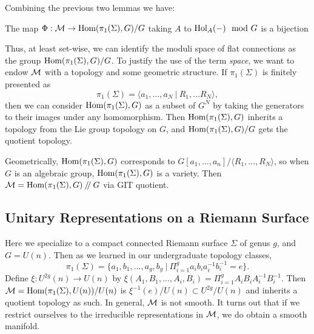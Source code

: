 	Combining the previous two lemmas we have:
	\begin{theorem}
		The map $\Phi:\mathcal{M} \to \text{Hom}(\pi_1(\Sigma), G)/G$ taking $A$ to $\text{Hol}_A(-) \mod G$ is a bijection
	\end{theorem}
	Thus, at least set-wise, we can identify the moduli space of flat connections as the group $\text{Hom}(\pi_1(\Sigma),G)/G$. To justify the use of the term \emph{space}, we want to endow $\mathcal{M}$ with a topology and some geometric structure. If $\pi_1(\Sigma)$ is finitely presented as
	\begin{equation}
		\pi_1(\Sigma) = \langle a_1,...,a_N ~|~ R_1,...R_N \rangle,
	\end{equation}
	then we can consider $\text{Hom}(\pi_1(\Sigma),G)$ as a subset of $G^N$ by taking the generators to their images under any homomorphism. Then $\text{Hom}(\pi_1(\Sigma),G)$ inherits a topology from the Lie group topology on $G$, and $\text{Hom}(\pi_1(\Sigma),G)/G$ gets the quotient topology. 
	
	Geometrically, $\text{Hom}(\pi_1(\Sigma),G)$ corresponds to $G[a_1,...,a_n]/\langle R_1,...,R_N\rangle$, so when $G$ is an algebraic group, $\text{Hom}(\pi_1(\Sigma),G)$ is a variety. Then $\mathcal{M} = \text{Hom}(\pi_1(\Sigma),G)\mathbin{/\mkern-4mu/} G$ via GIT quotient.
	
	
	
	\subsection{Unitary Representations on a Riemann Surface}
	Here we specialize to a compact connected Riemann surface $\Sigma$ of genus $g$, and $G=U(n)$. Then as we learned in our undergraduate topology classes,
	\begin{equation}
		\pi_1(\Sigma) = \{a_1, b_1,...,a_g, b_g ~|~ \Pi_{i=1}^g a_ib_ia_i^{-1}b_i^{-1} = e
		\}.
	\end{equation}
	Define $\xi:U^{2g}(n)\to U(n)$ by $\xi(A_1,B_1,...,A_i,B_i)=\Pi_{i=1}^g A_iB_iA_i^{-1}B_i^{-1}$. Then $\mathcal{M} = \text{Hom}(\pi_1(\Sigma),U(n))/U(n)$ is $\xi^{-1}(e)/U(n)\subset U^{2g}/U(n)$ and inherits a quotient topology as such. In general, $\mathcal{M}$ is not smooth. It turns out that if we restrict ourselves to the irreducible representations in $\mathcal{M}$, we do obtain a smooth manifold. 

